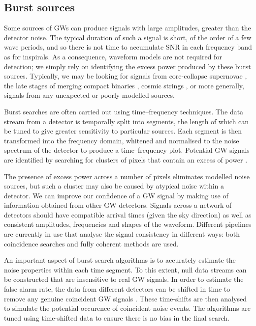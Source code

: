 \subsection{Burst sources}\label{sec:bursts}

Some sources of GWs can produce signals with large amplitudes, greater than the detector noise. The typical duration of such a signal is short, of the order of a few wave periods, and so there is not time to accumulate SNR in each frequency band as for inspirals. As a consequence, waveform models are not required for detection; we simply rely on identifying the excess power produced by these burst sources. Typically, we may be looking for signals from core-collapse supernovae \citep{Ott2009}, the late stages of merging compact binaries \citep{Abadie2012}, cosmic strings \citep{Aasi2014}, or more generally, signals from any unexpected or poorly modelled sources.

Burst searches are often carried out using time--frequency techniques. The data stream from a detector is temporally split into segments, the length of which can be tuned to give greater sensitivity to particular sources. Each segment is then transformed into the frequency domain, whitened and normalised to the noise spectrum of the detector to produce a time--frequency plot. Potential GW signals are identified by searching for clusters of pixels that contain an excess of power \citep[e.g.,][]{Bursts}.

The presence of excess power across a number of pixels eliminates modelled noise sources, but such a cluster may also be caused by atypical noise within a detector. We can improve our confidence of a GW signal by making use of information obtained from other GW detectors. Signals across a network of detectors should have compatible arrival times (given the sky direction) as well as consistent amplitudes, frequencies and shapes of the waveform. Different pipelines are currently in use that analyse the signal consistency in different ways: both coincidence searches \citep{Chatterji2004} and fully coherent methods \citep{Klimenko2008} are used.

An important aspect of burst search algorithms is to accurately estimate the noise properties within each time segment. To this extent, null data streams can be constructed that are insensitive to real GW signals. In order to estimate the false alarm rate, the data from different detectors can be shifted in time to remove any genuine coincident GW signals \citep{Cannon2008}. These time-shifts are then analysed to simulate the potential occurence of coincident noise events. The algorithms are tuned using time-shifted data to ensure there is no bias in the final search.

